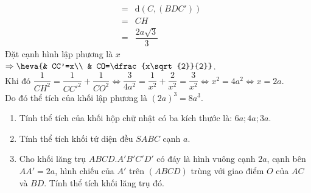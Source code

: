 \begin{ex}
{\begin{eqnarray*}
			&=&\mathrm{d}\left(C,\left(BDC'\right)\right)\\ 
			&=&CH\\ 
			&=&\dfrac{2a\sqrt{3}}{3} 
		\end{eqnarray*}
		Đặt cạnh  hình lập phương là $x$ $\Rightarrow\heva{& CC'=x\\ & CO=\dfrac{x\sqrt{2}}{2}}$.\\
		Khi đó $\dfrac{1}{CH^2}=\dfrac{1}{CC'^2}+\dfrac{1}{CO^2} 
		 \Leftrightarrow\dfrac{3}{4a^2}=\dfrac{1}{x^2}+\dfrac{2}{x^2}
		=\dfrac{3}{x^2}\Leftrightarrow{x^2}=4a^2\Leftrightarrow x=2a$.\\ 
		Do đó thể tích  của khối lập phương là $(2a)^3=8a^3$.
	} 
\end{ex}

\begin{bt}%
	\begin{enumerate}
		\item[a)] Tính thể tích của khối hộp chữ nhật có ba kích thước là: $6a ; 4a ; 3a$.
		\item[b)] Tính thể tích khối tứ diện đều $SABC$ cạnh $a$.
		\item[c)] Cho khối lăng trụ $ABCD. A'B'C'D'$  có đáy là hình vuông cạnh $2a$, cạnh bên $AA'=2 a$, hình chiếu của $A'$ trên $(ABCD)$ trùng với giao điểm $O$ của $AC$ và $BD$. Tính thể tích khối lăng trụ đó.
	\end{enumerate}
\end{bt}
